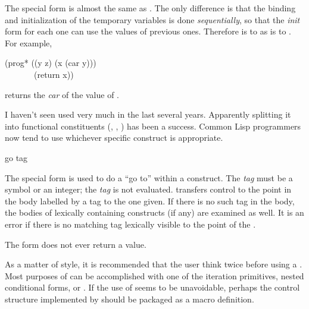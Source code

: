 \begin{defmac}
The  special form is almost the same as .  The only
difference is that the binding and initialization of the temporary
variables is done {\it sequentially}, so that the {\it init} form for each
one can use the values of previous ones.
Therefore  is to  as  is to .
For example,
\begin{lisp}
(prog* ((y z) (x (car y))) \\
~~~~~~~(return x))
\end{lisp}
returns the {\it car} of the value of .

\begin{new}
I haven't seen  used very much in the last several years.
Apparently splitting it into functional constituents
(, , ) has been a success.  Common Lisp
programmers now tend to use whichever specific construct is appropriate.
\end{new}
\end{defmac}

\begin{defspec}
go tag

The  special form is used to do a ``go to'' within
a  construct.  The {\it tag} must be a symbol or an integer;
the {\it tag} is not evaluated.
 transfers control to the point in the body labelled by a
tag  to the one given.  If there is no such tag in the body, the
bodies of lexically containing  constructs
(if any) are examined as well.
It is an error if there is no matching tag lexically visible
to the point of the .

The  form does not ever return a value.

As a matter of style, it is recommended that the user think twice before
using a .  Most purposes of  can be accomplished with one of
the iteration primitives, nested conditional forms, or
.  If the use of  seems to be unavoidable,
perhaps the control structure implemented by  should be packaged
as a macro definition.
\end{defspec}



